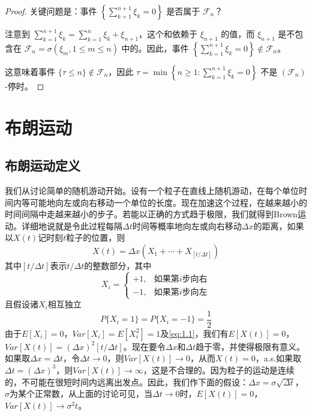 \documentclass[lang=cn,10pt,thmcnt=section]{elegantbook}
\begin{document}
\begin{proof}
关键问题是：事件 $\left\{\sum_{k=1}^{n+1} \xi_k = 0\right\}$ 是否属于 $\mathcal{F}_n$？

注意到 $\sum_{k=1}^{n+1} \xi_k = \sum_{k=1}^{n} \xi_k + \xi_{n+1}$，这个和依赖于 $\xi_{n+1}$ 的值，而 $\xi_{n+1}$ 是不包含在 $\mathcal{F}_n = \sigma(\xi_m, 1 \leq m \leq n)$ 中的。因此，事件 $\left\{\sum_{k=1}^{n+1} \xi_k = 0\right\} \notin \mathcal{F}_n$。

这意味着事件 $\{\tau \leq n\} \notin \mathcal{F}_n$，因此 $\tau = \min\left\{n \geq 1: \sum_{k=1}^{n+1} \xi_k = 0\right\}$ 不是 $(\mathcal{F}_n)$-停时。

\end{proof}










\chapter{布朗运动}
\section{布朗运动定义}
我们从讨论简单的随机游动开始。设有一个粒子在直线上随机游动，在每个单位时间内等可能地向左或向右移动一个单位的长度。现在加速这个过程，在越来越小的时间间隔中走越来越小的步子。若能以正确的方式趋于极限，我们就得到Brown运动。详细地说就是令此过程每隔$\Delta t$时间等概率地向左或向右移动$\Delta x$的距离，如果以$X(t)$记时刻$t$粒子的位置，则
\begin{equation}\label{eq:1.1}
X(t) = \Delta x (X_1 + \cdots + X_{[t/\Delta t]})
\end{equation}
其中$[t/\Delta t]$表示$t/\Delta t$的整数部分，其中
\[
X_i = \begin{cases} 
+1, & \text{如果第$i$步向右} \\
-1, & \text{如果第$i$步向左}
\end{cases}
\]
且假设诸$X_i$相互独立
\[
P\{X_i = 1\} = P\{X_i = -1\} = \frac{1}{2}
\]
由于$E[X_i] = 0$，$Var[X_i] = E[X_i^2] = 1$及\ref{eq:1.1}，我们有$E[X(t)] = 0$，$Var[X(t)] = (\Delta x)^2[t/\Delta t]$。现在要令$\Delta x$和$\Delta t$趋于零，并使得极限有意义。如果取$\Delta x = \Delta t$，令$\Delta t \to 0$，则$Var[X(t)] \to 0$，从而$X(t) = 0$，a.s.如果取$\Delta t = (\Delta x)^3$，则$Var[X(t)] \to \infty$，这是不合理的。因为粒子的运动是连续的，不可能在很短时间内远离出发点。因此，我们作下面的假设：$\Delta x = \sigma \sqrt{\Delta t}$，$\sigma$为某个正常数，从上面的讨论可见，当$\Delta t \to 0$时，$E[X(t)] = 0$，$Var[X(t)] \to \sigma^2 t$。
\end{document}
